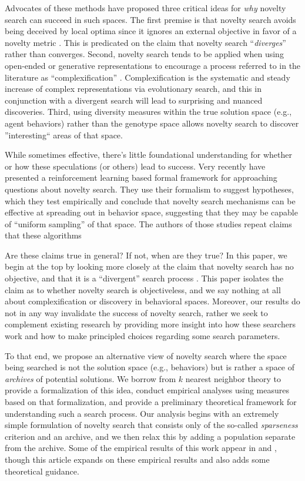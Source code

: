 \documentclass[twoside]{article}
\begin{document}
Advocates of these methods have proposed three critical ideas for \emph{why} novelty search can succeed in such spaces.  The first premise is that novelty search avoids being deceived by local optima since it ignores an external objective in favor of a novelty metric \citep{Lehman2011ecj}.  This is predicated on the claim that novelty search ``\emph{diverges}'' rather than converges.  Second, novelty search tends to be applied when using open-ended or generative representations \citep{LehmanStanley2008ssls} to encourage a process referred to in the literature as ``complexification'' \citep{StanleyMiikkulainen2004jair}.  Complexification is the systematic and steady increase of complex representations via evolutionary search, and this in conjunction with a divergent search will lead to surprising and nuanced discoveries.  Third, using diversity measures within the true solution space (e.g., agent behaviors) rather than the genotype space allows novelty search to discover ''interesting`` areas of that space.  

While sometimes effective, there's little foundational understanding for whether or how these speculations (or others) lead to success.  Very recently \citet{Doncieux2020gecco,Doncieux2019gecco} have presented a reinforcement learning based formal framework for approaching questions about novelty search.  They use their formalism to suggest hypotheses, which they test empirically and conclude that novelty search mechanisms can be effective at spreading out in behavior space, suggesting that they may be capable of ``uniform sampling'' of that space.  The authors of those studies repeat claims that these algorithms  

Are these claims true in general?  If not, when are they true?  In this paper, we begin at the top by looking more closely at the claim that novelty search has no objective, and that it is a ``divergent'' search process \citep{Lehman2016frai,Lehman2015gecco,StanleyLehman2015}.  This paper isolates the claim as to whether novelty search is objectiveless, and we say nothing at all about complexification or discovery in behavioral spaces.  Moreover, our results do not in any way invalidate the success of novelty search, rather we seek to complement existing research by providing more insight into how these searchers work and how to make principled choices regarding some search parameters.

To that end, we propose an alternative view of novelty search where the space being searched is not the solution space (e.g., behaviors) but is rather a space of \emph{archives} of potential solutions.  We borrow from $k$ nearest neighbor theory to provide a formalization of this idea, conduct empirical analyses using measures based on that formalization, and provide a preliminary theoretical framework for understanding such a search process.  Our analysis begins with an extremely simple formulation of novelty search that consists only of the so-called \emph{sparseness} criterion and an archive, and we then relax this by adding a population separate from the archive.  Some of the empirical results of this work appear in \citet{Wiegand2020flairs} and \citet{Wiegand2021flairs}, though this article expands on these empirical results and also adds some theoretical guidance.
\end{document}
